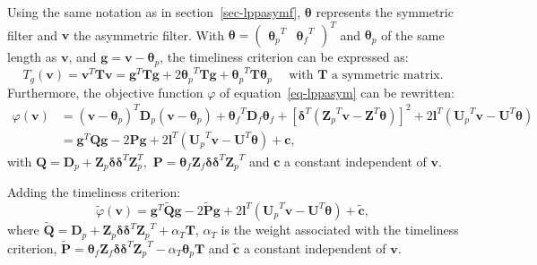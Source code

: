 \documentclass[
]{article}
\newcommand\transp[1]{{#1}^T}
\newcommand\1{\mathds{1}}
\begin{document}
Using the same notation as in section~\ref{sec-lppasymf},
\(\boldsymbol\theta\) represents the symmetric filter and
\(\boldsymbol v\) the asymmetric filter. With
\(\boldsymbol\theta=\transp{\begin{pmatrix}\transp{\boldsymbol\theta_p}&\transp{\boldsymbol\theta_f}\end{pmatrix}}\)
and \(\boldsymbol\theta_p\) of the same length as \(\boldsymbol v\), and
\(\boldsymbol g=\boldsymbol v-\boldsymbol \theta_p\), the timeliness
criterion can be expressed as: \[
T_g(\boldsymbol v)=\transp{\boldsymbol v}\boldsymbol T\boldsymbol v=\transp{\boldsymbol g}\boldsymbol T\boldsymbol g+2\transp{\boldsymbol \theta_p}\boldsymbol T\boldsymbol g+\transp{\boldsymbol \theta_p}\boldsymbol T\boldsymbol \theta_p
\quad\text{ with }\boldsymbol T\text{ a symmetric matrix}.
\] Furthermore, the objective function \(\varphi\) of
equation~\ref{eq-lppasym} can be rewritten: \begin{align*}
\varphi(\boldsymbol v)&=\transp{(\boldsymbol v-\boldsymbol \theta_p)}\boldsymbol D_{p}(\boldsymbol v-\boldsymbol \theta_p)+
  \transp{\boldsymbol \theta_f}\boldsymbol D_{f}\boldsymbol \theta_f+
  [\transp{\boldsymbol \delta}(\transp{\boldsymbol Z_{p}}\boldsymbol v-\transp{\boldsymbol Z}\boldsymbol \theta)]^{2}+
2\transp{\boldsymbol l}(\transp{\boldsymbol U_{p}}\boldsymbol v-\transp{\boldsymbol U}\boldsymbol \theta)\\
&=\transp{\boldsymbol g}\boldsymbol Q\boldsymbol g-2\boldsymbol P\boldsymbol g+2\transp{\boldsymbol l}(\transp{\boldsymbol U_{p}}\boldsymbol v-\transp{\boldsymbol U}\boldsymbol \theta)+\boldsymbol c,
\end{align*} with
\(\boldsymbol Q=\boldsymbol D_p+\boldsymbol Z_p\boldsymbol \delta\transp{\boldsymbol \delta}\transp{\boldsymbol Z}_p,\)
\(\boldsymbol P=\boldsymbol \theta_f\boldsymbol Z_f\boldsymbol \delta\transp{\boldsymbol \delta}\transp{\boldsymbol Z_p}\)
and \(\boldsymbol c\) a constant independent of \(\boldsymbol v.\)

Adding the timeliness criterion: \[
\widetilde\varphi(\boldsymbol v)=\transp{\boldsymbol g}\widetilde {\boldsymbol Q}\boldsymbol g-
2\widetilde {\boldsymbol P}\boldsymbol g+2\transp{\boldsymbol l}(\transp{\boldsymbol U_{p}}\boldsymbol v-\transp{\boldsymbol U}\boldsymbol \theta)+
\widetilde {\boldsymbol c},
\] where
\(\widetilde {\boldsymbol Q}=\boldsymbol D_p+\boldsymbol Z_p\boldsymbol \delta\transp{\boldsymbol \delta}\transp{\boldsymbol Z_p} + \alpha_T\boldsymbol T\),
\(\alpha_T\) is the weight associated with the timeliness criterion,
\(\widetilde {\boldsymbol P}=\boldsymbol \theta_f\boldsymbol Z_f\boldsymbol \delta\transp{\boldsymbol \delta}\transp{\boldsymbol Z_p}-\alpha_T\boldsymbol \theta_p\boldsymbol T\)
and \(\widetilde {\boldsymbol c}\) a constant independent of
\(\boldsymbol v.\)
\end{document}
